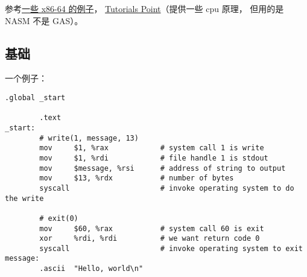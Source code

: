 
\begin{issues}
\issueDraft
\end{issues}

参考\href{https://cs.lmu.edu/~ray/notes/gasexamples/}{一些 x86-64 的例子}， \href{https://www.tutorialspoint.com/assembly_programming/index.htm}{Tutorials Point}（提供一些 cpu 原理， 但用的是 NASM 不是 GAS）。

\subsection{基础}
一个例子：
\begin{lstlisting}[language=none]
        .global _start

        .text
_start:
        # write(1, message, 13)
        mov     $1, %rax            # system call 1 is write
        mov     $1, %rdi            # file handle 1 is stdout
        mov     $message, %rsi      # address of string to output
        mov     $13, %rdx           # number of bytes
        syscall                     # invoke operating system to do the write

        # exit(0)
        mov     $60, %rax           # system call 60 is exit
        xor     %rdi, %rdi          # we want return code 0
        syscall                     # invoke operating system to exit
message:
        .ascii  "Hello, world\n"
\end{lstlisting}

